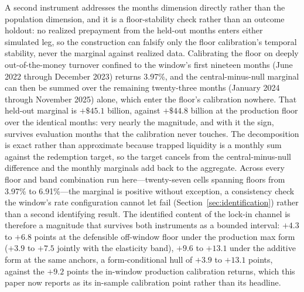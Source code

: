 \documentclass[12pt]{article}
\begin{document}
A second instrument addresses the months dimension directly rather than the population dimension, and it is a floor-stability check rather than an outcome holdout: no realized prepayment from the held-out months enters either simulated leg, so the construction can falsify only the floor calibration's temporal stability, never the marginal against realized data. Calibrating the floor on deeply out-of-the-money turnover confined to the window's first nineteen months (June 2022 through December 2023) returns 3.97\%, and the central-minus-null marginal can then be summed over the remaining twenty-three months (January 2024 through November 2025) alone, which enter the floor's calibration nowhere. That held-out marginal is $+\$45.1$ billion, against $+\$44.8$ billion at the production floor over the identical months: very nearly the magnitude, and with it the sign, survives evaluation months that the calibration never touches. The decomposition is exact rather than approximate because trapped liquidity is a monthly sum against the redemption target, so the target cancels from the central-minus-null difference and the monthly marginals add back to the aggregate. Across every floor and band combination run here---twenty-seven cells spanning floors from 3.97\% to 6.91\%---the marginal is positive without exception, a consistency check the window's rate configuration cannot let fail (Section~\ref{sec:identification}) rather than a second identifying result. The identified content of the lock-in channel is therefore a magnitude that survives both instruments as a bounded interval: $+4.3$ to $+6.8$ points at the defensible off-window floor under the production max form ($+3.9$ to $+7.5$ jointly with the elasticity band), $+9.6$ to $+13.1$ under the additive form at the same anchors, a form-conditional hull of $+3.9$ to $+13.1$ points, against the $+9.2$ points the in-window production calibration returns, which this paper now reports as its in-sample calibration point rather than its headline.
\end{document}
